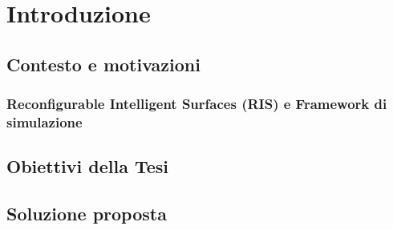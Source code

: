 \chapter{Introduzione}
\label{ch:introduzione}

\section{Contesto e motivazioni}
\label{sec:contesto}

\subsection{Reconfigurable Intelligent Surfaces (RIS) e Framework di simulazione}
\label{subsec:risframework}

\lipsum[1]

\lipsum[1]

\section{Obiettivi della Tesi}
\label{sec:obiettivi}

\lipsum[1]

\section{Soluzione proposta}
\label{sec:soluzione}

\lipsum[1]